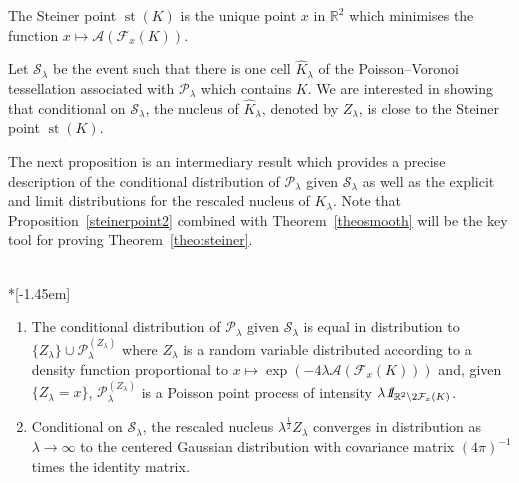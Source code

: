 \documentclass[AHL,Unicode,longabstracts,published]{cedram}
\newcommand{\indicat}{{\text{1}}\negthickspace\text{I}}
\newcommand{\cA}{\mathcal{A}}
\newcommand{\cF}{\mathcal{F}}
\newcommand{\cP}{\mathcal{P}}
\newcommand{\scS}{\mathscr{S}}
\newcommand{\R}{\mathbb{R}}
\DeclareMathOperator{\st}{st}
\newcommand{\pass}{\vspace{0.3cm}\noindent}
\newcommand{\noi}{\noindent}
\newcommand*{\romanenumi}{\renewcommand*{\theenumi}{\roman{enumi}}}
\newcommand{\R}{\mathbb{R}}
\begin{document}
\begin{prop}\label{prop:newcharac}
The Steiner point $\st (K)$ is the unique point $x$ in $\R^2$ which minimises the function $x\longmapsto \cA(\cF_x(K))$.
\end{prop}

Let $\scS_{\lambda}$ be the event such that there is one cell $\widehat{K}_\lambda$ of the Poisson--Voronoi tessellation associated with $\cP_{\lambda}$ which contains $K$. We are interested in showing that conditional on $\scS_{\lambda}$, the nucleus of $\widehat{K}_\lambda$, denoted by $Z_{\lambda}$, is close to the Steiner point $\st (K)$.

The next proposition is an intermediary result which provides a precise description of the conditional distribution of $\cP_{\lambda}$ given $\scS_{\lambda}$ as well as the explicit and limit distributions for the rescaled nucleus of $K_{\lambda}$. Note that Proposition~\ref{steinerpoint2} combined with Theorem~\ref{theosmooth} will be the key tool for proving Theorem~\ref{theo:steiner}.

\begin{prop}\label{steinerpoint2}\ \\*[-1.45em]
\begin{enumerate}\romanenumi
\item \label{prop5.2.1} The conditional distribution of $\cP_\lambda$ given $\scS_\lambda$ is equal in distribution to $\{Z_{\lambda}\}\cup \cP^{(Z_\lambda)}_\lambda$ where $Z_\lambda$ is a random variable distributed according to a density function proportional to $x\longmapsto\exp(-4\lambda\cA(\cF_x(K)))$ and, given $\{Z_{\lambda}=x\}$, $\cP^{(Z_\lambda)}_\lambda$ is a Poisson point process of intensity $\lambda{\emph{\indicat}}_{\R^2\setminus 2\cF_x(K)}$.
\item \label{prop5.2.2}Conditional on $\scS_{\lambda}$, the rescaled nucleus $\lambda^{\frac{1}{2}}Z_{\lambda}$ converges in distribution as $\lambda\to\infty$ to the centered Gaussian distribution with covariance matrix $(4\pi)^{-1}$ times the identity matrix.
\end{enumerate}
\end{prop}
\goodbreak
\end{document}
